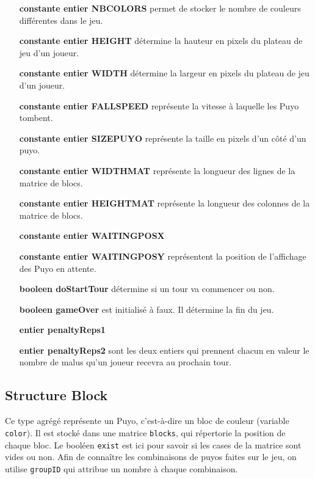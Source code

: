\documentclass[11pt, final]{report}
\renewcommand{\tt}[1]{\texttt{#1}}
\begin{document}
\begin{itemize}
\item[\textbf{constante entier NBCOLORS}] permet de stocker le nombre de couleurs différentes dans le jeu.
\item[\textbf{constante entier HEIGHT}] détermine la hauteur en pixels du plateau de jeu d’un joueur.
\item[\textbf{constante entier WIDTH}] détermine la largeur en pixels du plateau de jeu d’un joueur.
\item[\textbf{constante entier FALLSPEED}] représente la vitesse à laquelle les Puyo tombent.
\item[\textbf{constante entier SIZEPUYO}] représente la taille en pixels d’un côté d’un puyo.
\item[\textbf{constante entier WIDTHMAT}] représente la longueur des lignes de la matrice de blocs.
\item[\textbf{constante entier HEIGHTMAT}] représente la longueur des colonnes de la matrice de blocs.
\item[\textbf{constante entier WAITINGPOSX}]
\item[\textbf{constante entier WAITINGPOSY}] représentent la position de l'affichage des Puyo en attente. 
\item[\textbf{booleen doStartTour}] détermine si un tour va commencer ou non. 
\item[\textbf{booleen gameOver}] est initialisé à faux. Il détermine la fin du jeu.
\item[\textbf{entier penaltyReps1}]
\item[\textbf{entier penaltyReps2}] sont les deux entiers qui prennent chacun en valeur le nombre de malus qu'un joueur recevra au prochain tour. 
\end{itemize}

\subsection{Structure Block}



Ce type agrégé représente un Puyo, c'est-à-dire un bloc de couleur (variable \tt{color}). Il est stocké dans une matrice \tt{blocks}, qui répertorie la position de chaque bloc. Le booléen \tt{exist} est ici pour savoir si les cases de la matrice sont vides ou non. Afin de connaître les combinaisons de puyos faites sur le jeu, on utilise \tt{groupID} qui attribue un nombre à chaque combinaison. 
\\
\end{document}
